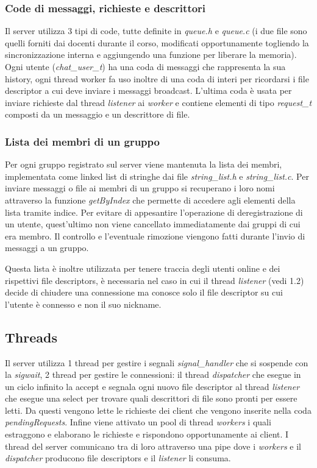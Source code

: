 \documentclass[11pt]{article}
\begin{document}
\subsubsection{Code di messaggi, richieste e descrittori}
Il server utilizza 3 tipi di code, tutte definite in \emph{queue.h} e \emph{queue.c} (i due file sono quelli forniti dai docenti durante il corso, modificati opportunamente togliendo la sincronizzazione interna e aggiungendo una funzione per liberare la memoria). Ogni utente (\emph{chat\_user\_t}) ha una coda di messaggi che rappresenta la sua history, ogni thread worker fa uso inoltre di una coda di interi per ricordarsi i file descriptor a cui deve inviare i messaggi broadcast. L'ultima coda è usata per inviare richieste dal thread \emph{listener} ai \emph{worker} e contiene elementi di tipo \emph{request\_t} composti da un messaggio e un descrittore di file.

\subsubsection{Lista dei membri di un gruppo}
Per ogni gruppo registrato sul server viene mantenuta la lista dei membri, implementata come linked list di stringhe dai file \emph{string\_list.h} e \emph{string\_list.c}. Per inviare messaggi o file ai membri di un gruppo si recuperano i loro nomi attraverso la funzione \emph{getByIndex} che permette di accedere agli elementi della lista tramite indice. Per evitare di appesantire l'operazione di deregistrazione di un utente, quest'ultimo non viene cancellato immediatamente dai gruppi di cui era membro. Il controllo e l'eventuale rimozione viengono fatti durante l'invio di messaggi a un gruppo.

Questa lista è inoltre utilizzata per tenere traccia degli utenti online e dei rispettivi file descriptors, è necessaria nel caso in cui il thread \emph{listener} (vedi 1.2) decide di chiudere una connessione ma conosce solo il file descriptor su cui l'utente è connesso e non il suo nickname.

\subsection{Threads}
Il server utilizza 1 thread per gestire i segnali \emph{signal\_handler} che si sospende con la \emph{sigwait}, 2 thread per gestire le connessioni: il thread \emph{dispatcher} che esegue in un ciclo infinito la accept e segnala ogni nuovo file descriptor al thread \emph{listener} che esegue una select per trovare quali descrittori di file sono pronti per essere letti. Da questi vengono lette le richieste dei client che vengono inserite nella coda \emph{pendingRequests}. Infine viene attivato un pool di thread \emph{workers} i quali estraggono e elaborano le richieste e rispondono opportunamente ai client. I thread del server comunicano tra di loro attraverso una pipe dove i \emph{workers} e il \emph{dispatcher} producono file descriptors e il \emph{listener} li consuma.
\end{document}

